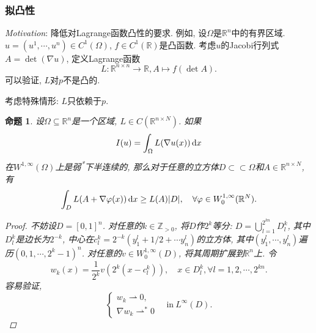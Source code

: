 \documentclass[12pt,a4paper]{article}
\newtheorem{proposition}[theorem]{命题}
\begin{document}
\subsubsection{拟凸性}

\emph{Motivation}: 降低对Lagrange函数凸性的要求. 例如, 设$\Omega$是$\mathbb{R}^n$中的有界区域. 
$u = (u^1, \cdots, u^n) \in C^1(\Omega)$, $f \in C^1(\mathbb{R})$是凸函数.
考虑$u$的Jacobi行列式$A = \det (\nabla u)$, 定义Lagrange函数 
\begin{equation*}
    L\colon \mathbb{R}^{n \times n} \rightarrow \mathbb{R}, A \mapsto f(\det A).
\end{equation*}
可以验证, $L$对$p$不是凸的.

考虑特殊情形: $L$只依赖于$p$.

\begin{proposition}
    设$\Omega \subseteq \mathbb{R}^n$是一个区域, $L \in C(\mathbb{R}^{n \times N})$. 
    如果 
    \begin{equation*}
        I(u) = \int_{\Omega}L(\nabla u(x)) \,{\rm d}x
    \end{equation*}
    在$W^{1, \infty}(\Omega)$上是弱\textsuperscript{*}下半连续的, 那么对于任意的立方体$D \subset \subset \Omega$和$A \in \mathbb{R}^{n \times N}$, 有 
    \begin{equation*}
        \int_DL(A + \nabla\varphi(x)) \,{\rm d}x \geq L(A)|D|, \quad \forall \varphi \in W_0^{1, \infty}(\mathbb{R}^N).
    \end{equation*}
    \begin{proof}
        不妨设$D = [0, 1]^n$. 对任意的$k \in \mathbb{Z}_{> 0}$, 将$D$作$2^k$等分: $D = \bigcup_{l = 1}^{2^{kn}}D_l^k$, 其中$D_l^k$是边长为$2^{-k}$, 中心在$c_l^k = 2^{-k}(y_1^l + 1/2 + \cdots y_n^l)$的立方体,
        其中$(y_1^l, \cdots, y_n^l)$遍历$(0, 1, \cdots, 2^k - 1)^n$. 对任意的$v \in W_0^{1, \infty}(D)$, 将其周期扩展到$\mathbb{R}^n$上. 
        令 
        \begin{equation*}
            w_k(x) = \frac{1}{2^k}v(2^k(x - c_l^k)), \quad x \in D_l^k, \forall l = 1, 2, \cdots, 2^{kn}.
        \end{equation*}  
        容易验证,  
        \begin{equation*}
            \begin{cases}
                w_k \rightharpoonup 0, \\
                \nabla w_k \rightharpoonup^* 0
            \end{cases}
            \quad \text{in}\ L^{\infty}(D).
        \end{equation*}

\end{proof}
\end{proposition}
\end{document}

